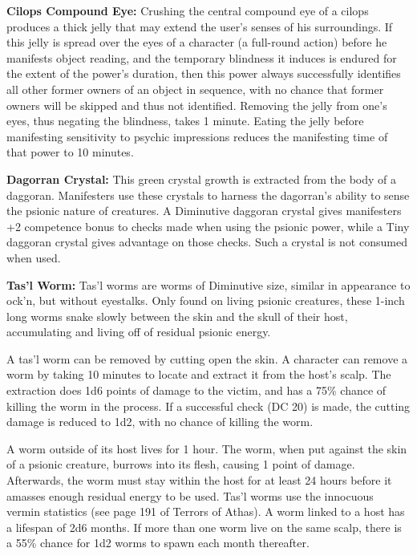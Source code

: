 \textbf{Cilops Compound Eye:} Crushing the central compound eye of a cilops produces a thick jelly that may extend the user's senses of his surroundings. If this jelly is spread over the eyes of a character (a full-round action) before he manifests object reading, and the temporary blindness it induces is endured for the extent of the power's duration, then this power always successfully identifies all other former owners of an object in sequence, with no chance that former owners will be skipped and thus not identified. Removing the jelly from one's eyes, thus negating the blindness, takes 1 minute. Eating the jelly before manifesting sensitivity to psychic impressions reduces the manifesting time of that power to 10 minutes.

\textbf{Dagorran Crystal:} This green crystal growth is extracted from the body of a daggoran. Manifesters use these crystals to harness the dagorran's ability to sense the psionic nature of creatures. A Diminutive daggoran crystal gives manifesters +2 competence bonus to  checks made when using the  psionic power, while a Tiny daggoran crystal gives advantage on those checks. Such a crystal is not consumed when used.

\textbf{Tas'l Worm:} Tas'l worms are worms of Diminutive size, similar in appearance to ock'n, but without eyestalks. Only found on living psionic creatures, these 1-inch long worms snake slowly between the skin and the skull of their host, accumulating and living off of residual psionic energy.

A tas'l worm can be removed by cutting open the skin. A character can remove a worm by taking 10 minutes to locate and extract it from the host's scalp. The extraction does 1d6 points of damage to the victim, and has a 75\% chance of killing the worm in the process. If a successful  check (DC 20) is made, the cutting damage is reduced to 1d2, with no chance of killing the worm.

A worm outside of its host lives for 1 hour. The worm, when put against the skin of a psionic creature, burrows into its flesh, causing 1 point of damage. Afterwards, the worm must stay within the host for at least 24 hours before it amasses enough residual energy to be used. Tas'l worms use the innocuous vermin statistics (see page 191 of Terrors of Athas). A worm linked to a host has a lifespan of 2d6 months. If more than one worm live on the same scalp, there is a 55\% chance for 1d2 worms to spawn each month thereafter.

